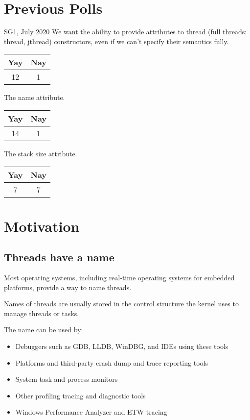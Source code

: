 \documentclass{wg21}
\begin{document}
\section{Previous Polls}

\begin{quoteblock}
SG1, July 2020
We want the ability to provide attributes to thread (full threads: thread, jthread) constructors, even if we can't specify their semantics fully.

\begin{tabular}{|c|c|}
\hline
Yay & Nay\\
\hline
12 & 1 \\
\hline
\end{tabular}
\end{quoteblock}
\begin{quoteblock}
The name attribute.

\begin{tabular}{|c|c|}
\hline
Yay & Nay\\
\hline
14 & 1 \\
\hline
\end{tabular}
\end{quoteblock}
\begin{quoteblock}
The stack size attribute.

\begin{tabular}{|c|c|}
\hline
Yay & Nay\\
\hline
7 & 7 \\
\hline
\end{tabular}
\end{quoteblock}


\section{Motivation}

\subsection{Threads have a name}

Most operating systems, including real-time operating systems for embedded platforms, provide a way to name threads.

Names of threads are usually stored in the control structure the kernel uses to manage threads or tasks.

The name can be used by:
\begin{itemize}
    \item Debuggers such as GDB, LLDB, WinDBG, and IDEs using these tools
    \item Platforms and third-party crash dump and trace reporting tools
    \item System task and process monitors
    \item Other profiling tracing and diagnostic tools
    \item Windows Performance Analyzer and ETW tracing
\end{itemize}
\end{document}

